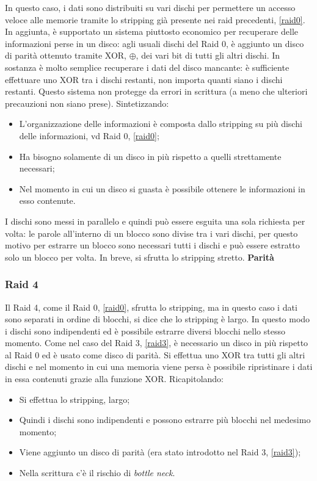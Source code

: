 \documentclass{article}
\begin{document}
In questo caso, i dati sono distribuiti su vari dischi per permettere un accesso veloce alle memorie tramite lo stripping già presente nei raid precedenti, \autoref{raid0}. In aggiunta, è supportato un sistema piuttosto economico per recuperare delle informazioni perse in un disco: agli usuali dischi del Raid 0, è aggiunto un disco di parità ottenuto tramite XOR, $\oplus$, dei vari bit di tutti gli altri dischi. In sostanza è molto semplice recuperare i dati del disco mancante: è sufficiente effettuare uno XOR tra i dischi restanti, non importa quanti siano i dischi restanti. Questo sistema non protegge da errori in scrittura (a meno che ulteriori precauzioni non siano prese). Sintetizzando:
\begin{itemize}
	\item L'organizzazione delle informazioni è composta dallo stripping su più dischi delle informazioni, vd Raid 0, \autoref{raid0};

	\item Ha bisogno solamente di un disco in più rispetto a quelli strettamente necessari;

	\item Nel momento in cui un disco si guasta è possibile ottenere le informazioni in esso contenute.
\end{itemize}

I dischi sono messi in parallelo e quindi può essere esguita una sola richiesta per volta: le parole all'interno di un blocco sono divise tra i vari dischi, per questo motivo per estrarre un blocco sono necessari tutti i dischi e può essere estratto solo un blocco per volta. In breve, si sfrutta lo stripping stretto. \textbf{Parità}

\subsubsection{Raid 4}
\label{raid4}

Il Raid 4, come il Raid 0, \autoref{raid0}, sfrutta lo stripping, ma in questo caso i dati sono separati in ordine di blocchi, si dice che lo stripping è largo. In questo modo i dischi sono indipendenti ed è possibile estrarre diversi blocchi nello stesso momento. Come nel caso del Raid 3, \autoref{raid3}, è necessario un disco in più rispetto al Raid 0 ed è usato come disco di parità. Si effettua uno XOR tra tutti gli altri dischi e nel momento in cui una memoria viene persa è possibile ripristinare i dati in essa contenuti grazie alla funzione XOR. Ricapitolando:
\begin{itemize}
	\item Si effettua lo stripping, largo;

	\item Quindi i dischi sono indipendenti e possono estrarre più blocchi nel medesimo momento;

	\item Viene aggiunto un disco di parità (era stato introdotto nel Raid 3, \autoref{raid3});

	\item Nella scrittura c'è il rischio di \textit{bottle neck}.
\end{itemize}
\end{document}
